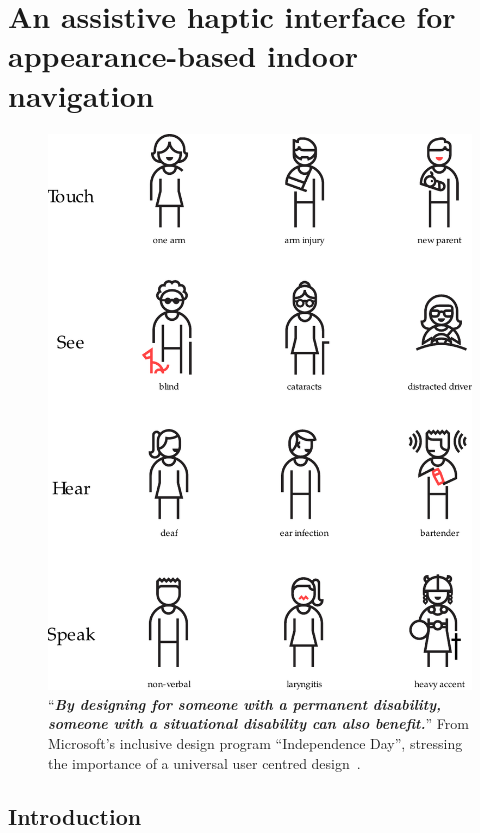 \chapter{An assistive haptic interface for appearance-based indoor navigation}\label{ch:chapter6}


\begin{figure}[h]
\centering
\includegraphics[scale=0.5]{gfx/Chapter06/inclusive_design.pdf}
\caption{``\textit{\textbf{By designing for someone with a permanent disability, someone with a situational disability can also benefit.}}'' From Microsoft's inclusive design program ``Independence Day'', stressing the importance of a universal user centred design~\cite{msinclusivedesign}.}
\label{fig:microsoft_inclusive_design}
\end{figure}

\section{Introduction}
\label{sec:Intro}

